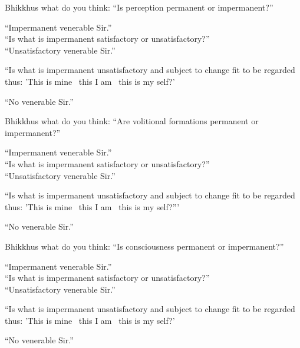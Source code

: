 \begin{english-only-nohang}
  \begin{english-only-hang}
    Bhikkhus what do you think: ``Is perception permanent or impermanent?''
  \end{english-only-hang}
  ``Impermanent venerable Sir.''\\
  ``Is what is impermanent satisfactory or unsatisfactory?''\\
  ``Unsatisfactory venerable Sir.''\\
  \begin{english-hangtogether}
    ``Is what is impermanent unsatisfactory and subject to change fit to be regarded thus: 'This is mine \breathmark\ this I am \breathmark\ this is my self?'
  \end{english-hangtogether}
  ``No venerable Sir.''
\end{english-only-nohang}

\begin{english-only-nohang}
  \begin{english-only-hang}
    Bhikkhus what do you think: ``Are volitional formations permanent or impermanent?''
  \end{english-only-hang}
  ``Impermanent venerable Sir.''\\
  ``Is what is impermanent satisfactory or unsatisfactory?''\\
  ``Unsatisfactory venerable Sir.''
  \begin{english-hangtogether}
    ``Is what is impermanent unsatisfactory and subject to change fit to be regarded thus: 'This is mine \breathmark\ this I am \breathmark\ this is my self?'''
  \end{english-hangtogether}
  ``No venerable Sir.''
\end{english-only-nohang}

\begin{english-only-nohang}
  \begin{english-only-hang}
    Bhikkhus what do you think: ``Is consciousness permanent or impermanent?''
  \end{english-only-hang}
  ``Impermanent venerable Sir.''\\
  ``Is what is impermanent satisfactory or unsatisfactory?''\\
  ``Unsatisfactory venerable Sir.''\\
  \begin{english-hangtogether}
    ``Is what is impermanent unsatisfactory and subject to change fit to be regarded thus: 'This is mine \breathmark\ this I am \breathmark\ this is my self?'
  \end{english-hangtogether}
  ``No venerable Sir.''
\end{english-only-nohang}

